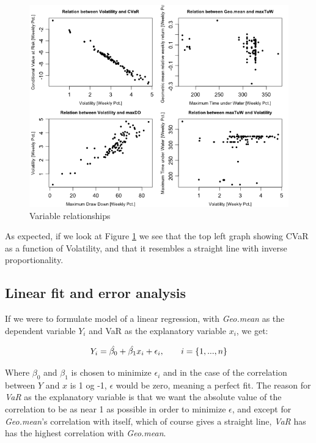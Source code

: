 \documentclass{article}
\begin{document}
\begin{figure}[h!]
\centering
\includegraphics[width=\textwidth]{fig/Rplot.png}
\caption{Variable relationships}
\label{fig:4p}
\end{figure}


As expected, if we look at Figure \ref{fig:4p} we see that the top left graph showing CVaR as a function of Volatility, and that it resembles a straight line with inverse proportionality. 

\subsection{Linear fit and error analysis}
If we were to formulate model of a linear regression, with \textit{Geo.mean} as the dependent variable $Y_i$ and VaR as the explanatory variable $x_i$, we get: 

\begin{equation}
Y_i = \hat{\beta_0}+\hat{\beta_1} x_i + \epsilon_i , \hspace{7 mm} i=\{1,...,n\}
\end{equation}

\vspace{2mm}
Where $\beta_0$ and $\beta_1$ is chosen to minimize $\epsilon_i$ and in the case of the correlation between $Y$ and $x$ is 1 og -1, $\epsilon$ would be zero, meaning a perfect fit. The reason for \textit{VaR} as the explanatory variable is that we want the absolute value of the correlation to be as near 1 as possible in order to minimize $\epsilon$, and except for \textit{Geo.mean}'s correlation with itself, which of course gives a straight line, \textit{VaR} has has the highest correlation with \textit{Geo.mean}. \\
\end{document}
